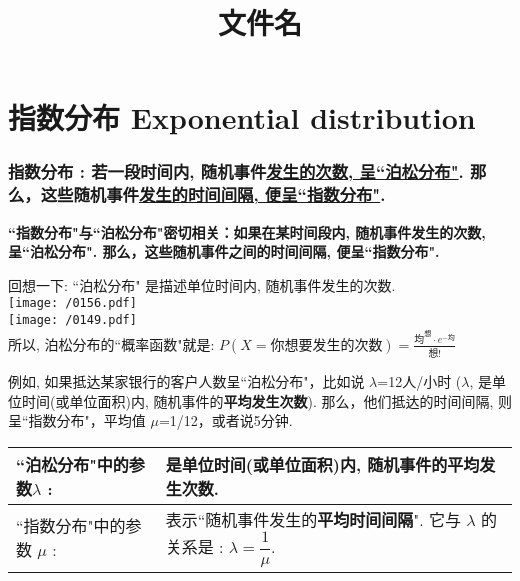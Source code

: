 \documentclass[UTF8]{ctexart}
\title{文件名}
\begin{document}
	\tableofcontents %
	\date{} %
	\maketitle  %
	
	


	
	\part{指数分布 Exponential distribution}
	
	\section{指数分布 : 若一段时间内, 随机事件\underline{发生的次数, 呈``泊松分布"}. 那么，这些随机事件\underline{发生的时间间隔, 便呈``指数分布"}.}
	
	\textbf{``指数分布"与``泊松分布"密切相关：如果在某时间段内, 随机事件发生的次数, 呈``泊松分布". 那么，这些随机事件之间的时间间隔, 便呈``指数分布".} \\
	
	\begin{myEnvSample}
	回想一下: ``泊松分布" 是描述单位时间内, 随机事件发生的次数. \\

\texttt{[image: /0156.pdf]} \\

\texttt{[image: /0149.pdf]} \\
所以, 泊松分布的``概率函数"就是: $\boxed{
	P\left(X=\text{你想要发生的次数} \right) =\frac{\text{均}^{\text{想}}\cdot e^{-\text{均}}}{\text{想!}}
}$
	\end{myEnvSample}

	
	例如, 如果抵达某家银行的客户人数呈``泊松分布"，比如说 $\lambda$=12人/小时 ($\lambda$, 是单位时间(或单位面积)内, 随机事件的\textbf{平均发生次数}). 那么，他们抵达的时间间隔, 则呈``指数分布"，平均值 $\mu$=1/12，或者说5分钟. \\
	
	\begin{tabular}{|l|l|}
		\hline
		``泊松分布"中的参数$\lambda$ : &  是单位时间(或单位面积)内, 随机事件的\textbf{平均发生次数}.\\
		\hline
			``指数分布"中的参数 $\mu$ : &  表示``随机事件发生的\textbf{平均时间间隔}". 它与 $\lambda$ 的关系是 : $ \boxed{ \lambda = \dfrac{1} {\mu}}$.\\
		\hline
	\end{tabular} \\
\end{document}
